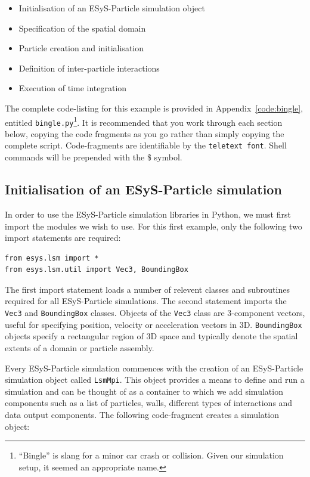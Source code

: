 \begin{itemize}
   \item Initialisation of an ESyS-Particle simulation object
   \item Specification of the spatial domain
   \item Particle creation and initialisation
   \item Definition of inter-particle interactions
   \item Execution of time integration
\end{itemize}

The complete code-listing for this example is provided in Appendix~\ref{code:bingle}, entitled \texttt{bingle.py}\footnote{``Bingle'' is slang for a minor car crash or collision. Given our simulation setup, it seemed an appropriate name.}. It is recommended that you work through each section below, copying the code fragments as you go rather than simply copying the complete script. Code-fragments are identifiable by the \texttt{teletext font}. Shell commands will be prepended with the \$ symbol.

\subsection{Initialisation of an ESyS-Particle simulation}

In order to use the ESyS-Particle simulation libraries in Python, we must first import the modules we wish to use. For this first example, only the following two import statements are required:

\begin{verbatim}
from esys.lsm import *
from esys.lsm.util import Vec3, BoundingBox
\end{verbatim}

The first import statement loads a number of relevent classes and subroutines required for all ESyS-Particle simulations. The second statement imports the \texttt{Vec3} and \texttt{BoundingBox} classes. Objects of the \texttt{Vec3} class are 3-component vectors, useful for specifying position, velocity or acceleration vectors in 3D. \texttt{BoundingBox} objects specify a rectangular region of 3D space and typically denote the spatial extents of a domain or particle assembly.

Every ESyS-Particle simulation commences with the creation of an ESyS-Particle simulation object called \texttt{LsmMpi}. This object provides a means to define and run a simulation and can be thought of as a container to which we add simulation components such as a list of particles, walls, different types of interactions and data output components. The following code-fragment creates a simulation object:

